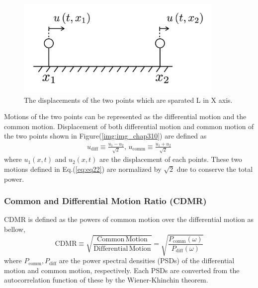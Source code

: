 \begin{figure}[h]
  \begin{center}
    \includegraphics[width=10.0cm]{./img_chap3/img315.png}
    \caption{The displacements of the two points which are sparated L in X axis. }
  \end{center}
\end{figure}


Motions of the two points can be represented as the differential motion and the common motion. Displacement of both differential motion and common motion of the two points shown in Figure(\ref{img:img_chap310}) are defined as
\begin{eqnarray}\label{eq:eq22}
  u_{\mathrm{diff}} \equiv \frac{u_{1}-u_{2}}{\sqrt{2}}, \,
  u_{\mathrm{comm}}  \equiv \frac{u_{1}+u_{2}}{\sqrt{2}}
\end{eqnarray}
where $u_{1}(x,t)$ and $u_2(x,t)$ are the displacement of each points. These two motions defined in Eq.(\ref{eq:eq22}) are normalized by $\sqrt{2}$ due to conserve the total power.


\subsubsection{Common and Differential Motion Ratio (CDMR)}
CDMR is defined as the powers of common motion over the differential motion as bellow,
\begin{equation}
  \mathrm{CDMR} \equiv \sqrt{\frac{\mathrm{Common\,Motion}}{\mathrm{Differential\,Motion}}} = \sqrt{\frac{P_{\mathrm{comm}}(\omega)}{P_{\mathrm{diff}}(\omega)}} \label{eq:eq23}
\end{equation}
where $P_{\mathrm{comm}},P_{\mathrm{diff}}$ are the power spectral densities (PSDs) of the differential motion and common motion, respectively. Each PSDs are converted from the autocorrelation function of these by the Wiener-Khinchin theorem.

